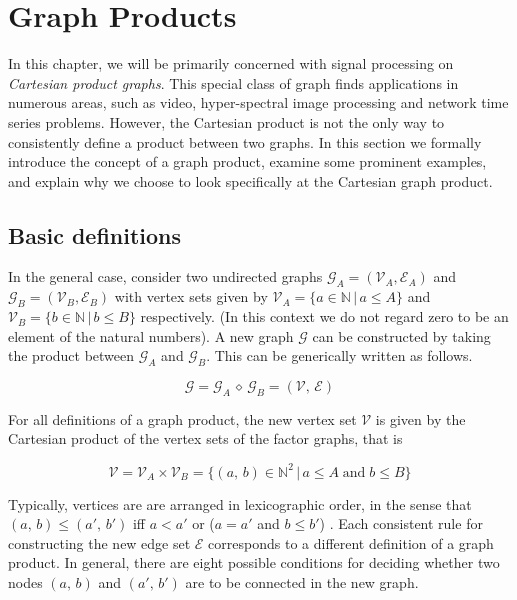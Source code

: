\section{Graph Products}

\label{sec:reg_and_rec_intro}

In this chapter, we will be primarily concerned with signal processing on \textit{Cartesian product graphs}. This special class of graph finds applications in numerous areas, such as video, hyper-spectral image processing and network time series problems. However, the Cartesian product is not the only way to consistently define a product between two graphs. In this section we formally introduce the concept of a graph product, examine  some prominent examples, and explain why we choose to look specifically at the Cartesian graph product.

\subsection{Basic definitions}

\label{sec:graph_products_defined}

In the general case, consider two undirected graphs $\mathcal{G}_A = (\mathcal{V}_A, \mathcal{E}_A)$ and $\mathcal{G}_B = (\mathcal{V}_B, \mathcal{E}_B)$ with vertex sets given by $\mathcal{V}_A = \{a \in \mathbb{N} \, | \, a \leq A \}$ and $\mathcal{V}_B = \{b \in \mathbb{N} \, | \, b \leq B \}$ respectively. (In this context we do not regard zero to be an element of the natural numbers). A new graph $\mathcal{G}$ can be constructed by taking the product between $\mathcal{G}_A$ and $\mathcal{G}_B$. This can be generically written as follows.

\begin{equation}
    \mathcal{G} = \mathcal{G}_A \, \diamond \, \mathcal{G}_B = (\mathcal{V}, \, \mathcal{E})
\end{equation}

For all definitions of a graph product, the new vertex set $\mathcal{V}$ is given by the Cartesian product of the vertex sets of the factor graphs, that is

\begin{equation}
    \mathcal{V} = \mathcal{V}_A \times \mathcal{V}_B = \{(a, \, b) \in \mathbb{N}^2 \, | \, a \leq A \; \text{and} \; b \leq B \}
\end{equation}


Typically, vertices are are arranged in lexicographic order, in the sense that $(a, \, b) \leq (a',\, b')$ iff $a < a'$ or ($a = a'$ and $b \leq b'$) \citep{Harzheim2005}. Each consistent rule for constructing the new edge set $\mathcal{E}$ corresponds to a different definition of a graph product. In general, there are eight possible conditions for deciding whether two nodes $(a, \, b)$ and $(a',\,  b')$ are to be connected in the new graph.


